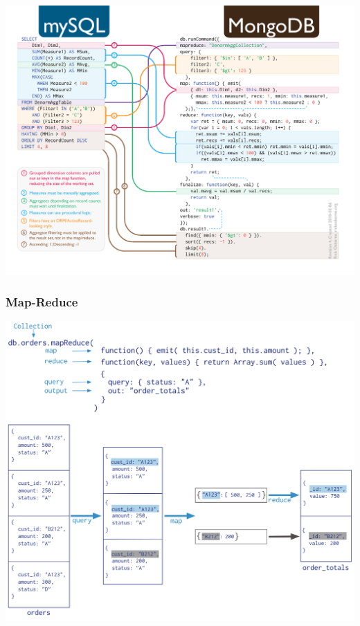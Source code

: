 \documentclass[14pt]{beamer}
\begin{document}
\begin{frame}[plain]
  \includegraphics[width=\textwidth]{img/sql-to-mongodb}
\end{frame}


\begin{frame}
  \frametitle{Map-Reduce}
  \centering\includegraphics[height=.85\textheight]{img/mongo-map-reduce}
\end{frame}
\end{document}
